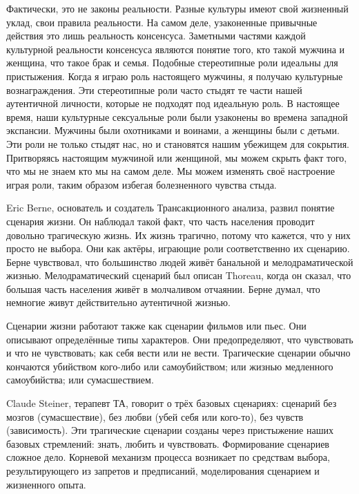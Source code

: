 \documentclass[10pt, fleqn]{article}
\begin{document}
Фактически, это не законы реальности. Разные культуры имеют свой жизненный уклад, свои правила реальности. На самом деле, узаконенные привычные действия это лишь реальность консенсуса.
Заметными частями каждой культурной реальности консенсуса являются понятие того, кто такой мужчина и женщина, что такое брак и семья.
Подобные стереотипные роли идеальны для пристыжения. Когда я играю роль настоящего мужчины, я получаю культурные вознаграждения. Эти стереотипные роли часто стыдят те части нашей аутентичной личности, которые не подходят под идеальную роль. В настоящее время, наши культурные сексуальные роли были узаконены во времена западной экспансии. Мужчины были охотниками и воинами, а женщины были с детьми.
Эти роли не только стыдят нас, но и становятся нашим убежищем для сокрытия. Притворяясь настоящим мужчиной или женщиной, мы можем скрыть факт того, что мы не знаем кто мы на самом деле. Мы можем изменять своё настроение играя роли, таким образом избегая болезненного чувства стыда.


Eric Berne, основатель и создатель Трансакционного анализа, развил понятие сценария жизни. Он наблюдал такой факт, что часть населения проводит довольно трагическую жизнь. Их жизнь трагично, потому что кажется, что у них просто не выбора. Они как актёры, играющие роли соответственно их сценарию. Берне чувствовал, что большинство людей живёт банальной и мелодраматической жизнью. Мелодраматический сценарий был описан Thoreau, когда он сказал, что большая часть населения живёт в молчаливом отчаянии. Берне думал, что немногие живут действительно аутентичной жизнью.

Сценарии жизни работают также как сценарии фильмов или пьес. Они описывают определённые типы характеров. Они предопределяют, что чувствовать и что не чувствовать; как себя вести или не вести. Трагические сценарии обычно кончаются убийством кого-либо или самоубийством; или жизнью медленного самоубийства; или сумасшествием.

Claude Steiner, терапевт ТА, говорит о трёх базовых сценариях: сценарий без мозгов (сумасшествие), без любви (убей себя или кого-то), без чувств (зависимость). Эти трагические сценарии созданы через пристыжение наших базовых стремлений: знать, любить и чувствовать.
Формирование сценариев сложное дело. Корневой механизм процесса возникает по средствам выбора, результирующего из запретов и предписаний, моделирования сценарием и жизненного опыта.

\end{document}
